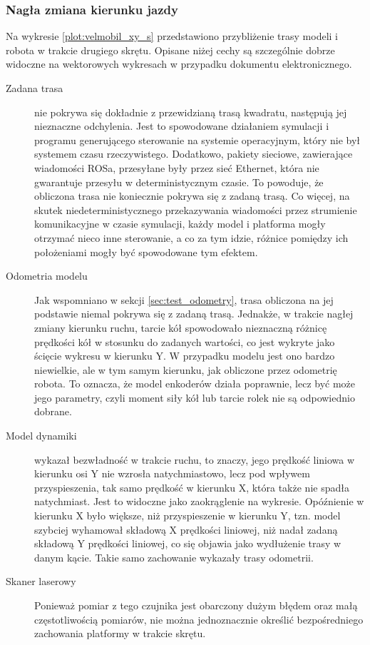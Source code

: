 		\subsubsection{Nagła zmiana kierunku jazdy}
			Na wykresie \ref{plot:velmobil_xy_s} przedstawiono przybliżenie trasy modeli i robota w trakcie drugiego skrętu.
			Opisane niżej cechy są szczególnie dobrze widoczne na wektorowych wykresach w przypadku dokumentu elektronicznego.
			\begin{description}
				\item[Zadana trasa] nie pokrywa się dokładnie z przewidzianą trasą kwadratu, następują jej nieznaczne odchylenia.
				Jest to spowodowane działaniem symulacji i programu generującego sterowanie na systemie operacyjnym, który nie był systemem czasu rzeczywistego.
				Dodatkowo, pakiety sieciowe, zawierające wiadomości ROSa, przesyłane były przez sieć Ethernet, która nie gwarantuje przesyłu w deterministycznym czasie.
				To powoduje, że obliczona trasa nie koniecznie pokrywa się z zadaną trasą. Co więcej, na skutek niedeterministycznego przekazywania wiadomości przez strumienie komunikacyjne w czasie symulacji, każdy model i platforma mogły otrzymać nieco inne sterowanie, a co za tym idzie, różnice pomiędzy ich położeniami mogły być spowodowane tym efektem.
				\item[Odometria modelu] Jak wspomniano w sekcji \ref{sec:test_odometry}, trasa obliczona na jej podstawie niemal pokrywa się z zadaną trasą. 
				Jednakże, w trakcie nagłej zmiany kierunku ruchu, tarcie kół spowodowało nieznaczną różnicę prędkości kół w stosunku do zadanych wartości, co jest 
				wykryte jako ścięcie wykresu w kierunku Y. W przypadku modelu jest ono bardzo niewielkie, ale w tym samym kierunku, jak obliczone przez odometrię robota.
				To oznacza, że model enkoderów działa poprawnie, lecz być może jego parametry, czyli moment siły kół lub tarcie rolek nie są odpowiednio dobrane.
				\item[Model dynamiki] wykazał bezwładność w trakcie ruchu, to znaczy, jego prędkość liniowa w kierunku osi Y nie wzrosła natychmiastowo,
				lecz pod wpływem przyspieszenia, tak samo prędkość w kierunku X, która także nie spadła natychmiast.
				Jest to widoczne jako zaokrąglenie na wykresie.
				Opóźnienie w kierunku X było większe, niż przyspieszenie w kierunku Y, tzn. model szybciej wyhamował składową X prędkości liniowej, niż nadał zadaną składową Y prędkości liniowej, co się objawia jako wydłużenie trasy w danym kącie. Takie samo zachowanie wykazały trasy odometrii.
				\item[Skaner laserowy] Ponieważ pomiar z tego czujnika jest obarczony dużym błędem oraz małą częstotliwością pomiarów, nie można jednoznacznie określić bezpośredniego zachowania platformy w trakcie skrętu.

\end{description}
